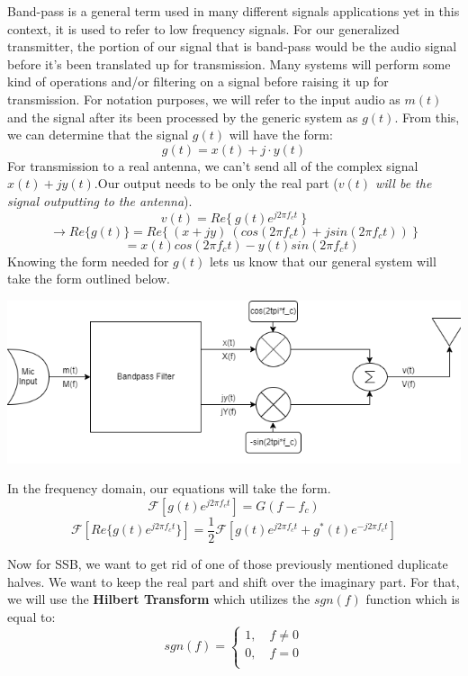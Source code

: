 \documentclass[12pt]{article}
\begin{document}
Band-pass is a general term used in many different signals applications yet in this context, it is used to refer to low frequency signals. For our generalized transmitter, the portion of our signal that is band-pass would be the audio signal before it's been translated up for transmission. Many systems will perform some kind of operations and/or filtering on a signal before raising it up for transmission. For notation purposes, we will refer to the input audio as $m(t)$ and the signal after its been processed by the generic system as $g(t)$. From this, we can determine that the signal $g(t)$ will have the form:
$$g(t) = x(t) + j\cdot y(t)$$ 
For transmission to a real antenna, we can't send all of the complex signal $x(t) + jy(t)$.Our output needs to be only the real part (\textit{$v(t)$ will be the signal outputting to the antenna}).
$$v(t)=Re\{ \ g(t)e^{j2\pi f_ct} \ \}$$
$$\rightarrow Re\{ g(t)\} = Re\{\ (x+jy)\ (cos(2\pi f_ct) + jsin(2\pi f_ct))\ \} $$
$$\quad \ = x(t)cos(2\pi f_ct) - y(t)sin(2\pi f_ct)$$
Knowing the form needed for $g(t)$ lets us know that our general system will take the form outlined below.
\begin{center}
\includegraphics[scale=0.75]{BPF_Top}
\end{center}

In the frequency domain, our equations will take the form.
$$\mathscr{F} [g(t)e^{j2\pi f_ct}] = G(f-f_c) $$
$$\mathscr{F} [Re\{ g(t)e^{j2\pi f_ct} \}] = \frac{1}{2}\mathscr{F} [g(t)e^{j2\pi f_ct} + g^*(t)e^{-j2\pi f_ct} ] $$


Now for SSB, we want to get rid of one of those previously mentioned duplicate halves. We want to keep the real part and shift over the imaginary part. For that, we will use the \textbf{Hilbert Transform} which utilizes the $sgn(f)$ function which is equal to: 
\[
    sgn(f)=\left\{
                \begin{array}{ll}
                  1, \quad f \neq 0\\
                  0, \quad f = 0 \\
                \end{array}
              \right.
  \]
\end{document}
